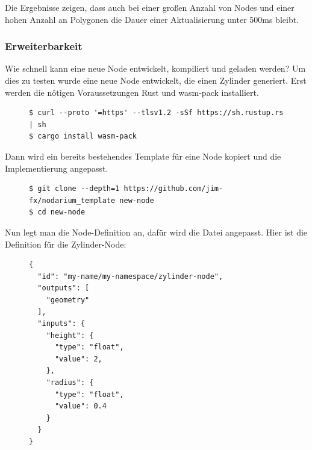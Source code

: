 \documentclass[ngerman]{article}
\begin{document}
Die Ergebnisse zeigen, dass auch bei einer großen Anzahl von Nodes und einer hohen Anzahl an Polygonen die Dauer einer Aktualisierung unter 500ms bleibt. 

\pagebreak

\subsubsection{Erweiterbarkeit}

Wie schnell kann eine neue Node entwickelt, kompiliert und geladen werden? Um dies zu testen wurde eine neue Node entwickelt, die einen Zylinder generiert. 
\br
Erst werden die nötigen Voraussetzungen Rust und wasm-pack installiert.

\begin{figure}[htbp]
  \begin{code}
    \begin{verbatim}
$ curl --proto '=https' --tlsv1.2 -sSf https://sh.rustup.rs | sh
$ cargo install wasm-pack
    \end{verbatim}
  \end{code}
\end{figure}

Dann wird ein bereits bestehendes Template für eine Node kopiert und die Implementierung angepasst. 

\begin{figure}[htbp]
  \begin{code}
    \begin{verbatim}
$ git clone --depth=1 https://github.com/jim-fx/nodarium_template new-node
$ cd new-node
    \end{verbatim}
  \end{code}
\end{figure}


Nun legt man die Node-Definition an, dafür wird die Datei  angepasst. Hier ist die Definition für die Zylinder-Node:


\begin{figure}[htbp]
  \begin{code}
    \begin{verbatim}
{
  "id": "my-name/my-namespace/zylinder-node",
  "outputs": [
    "geometry"
  ],
  "inputs": {
    "height": {
      "type": "float",
      "value": 2,
    },
    "radius": {
      "type": "float",
      "value": 0.4
    }
  }
}
    \end{verbatim}
  \end{code}
\end{figure}
\end{document}
